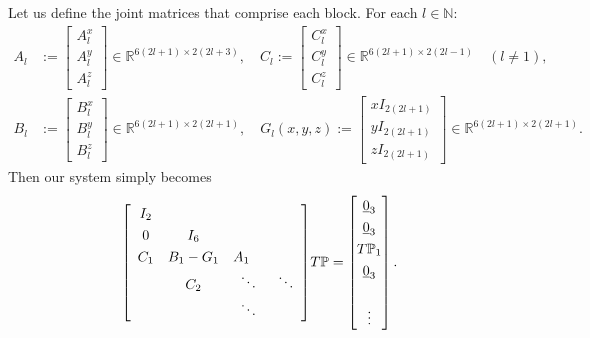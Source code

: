 \documentclass[11pt, oneside]{article}   	%
\newcommand{\R}{\mathbb{R}}
\newcommand{\N}{\mathbb{N}}
\newcommand{\gradP}{T\mathbb{P}}
\begin{document}
Let us define the joint matrices that comprise each block. For each \(l \in \N\):
\begin{align}
A_l &:= \begin{bmatrix}
		A^x_l \\
		A^y_l \\
		A^z_l
	    \end{bmatrix} \in \R^{6(2l+1)\times2(2l+3)}, \quad
C_l := \begin{bmatrix}
		C^x_l \\
		C^y_l \\
		C^z_l
	    \end{bmatrix} \in \R^{6(2l+1)\times2(2l-1)} \quad (l \ne 1), \\
B_l &:= \begin{bmatrix}
		B^x_l \\
		B^y_l \\
		B^z_l
	    \end{bmatrix} \in \R^{6(2l+1)\times2(2l+1)}, \quad
G_l(x,y,z) := \begin{bmatrix}
		xI_{2(2l+1)} \\
		yI_{2(2l+1)} \\
		zI_{2(2l+1)}
	    \end{bmatrix} \in \R^{6(2l+1)\times2(2l+1)}.
\end{align}
Then our system simply becomes
\begin{align}
\renewcommand\arraystretch{1.3}
\mleft[
\begin{array}{cccc}
		I_2 \\
		0 & I_6 & & \\
		C_1 & B_1-G_1 & A_1 \quad & \\
		& C_2 & \ddots & \ddots \\
		& & \ddots &
\end{array}
\mright]
\gradP
=
\begin{bmatrix}
	\underline{0}_3 \\ \underline{0}_3 \\ \gradP_1 \\ \underline{0}_3 \\ \\ \vdots \\
\end{bmatrix}.
\end{align}
\end{document}

